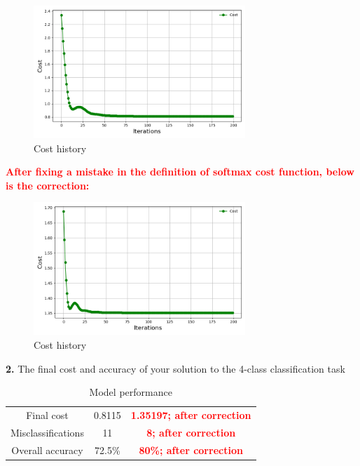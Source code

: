 \begin{figure}[H]
    \centering
    \includegraphics[width=80mm]{task3-cost.png}
    \caption{Cost history}
    \label{fig:enter-label}
\end{figure}

\textbf{\textcolor{red}{After fixing a mistake in the definition of softmax cost function, below is the correction: }}
\begin{figure}[H]
    \centering
    \includegraphics[width=80mm]{task3-cost-corrected.png}
    \caption{Cost history}
    \label{fig:enter-label}
\end{figure}

\textbf{2.} The final cost and accuracy of your solution to the 4-class classification task
\begin{table}[H]
    \centering
    \begin{tabular}{|c|c|c|}
    \hline
        Final cost & 0.8115 & \textbf{\textcolor{red}{1.35197; after correction}}\\
        Misclassifications &  11 & \textbf{\textcolor{red}{8; after correction}}\\
        Overall accuracy &  72.5\% & \textbf{\textcolor{red}{80\%; after correction}}  \\
    \hline
    \end{tabular}
    \caption{Model performance}
    \label{tab:my_label}
\end{table}

